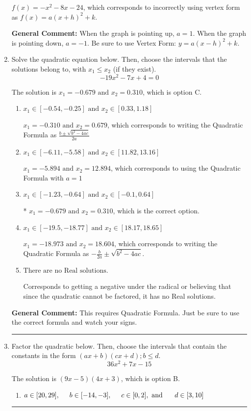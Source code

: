 \documentclass{extbook}[14pt]
\newcommand{\litem}[1]{\item #1

\rule{\textwidth}{0.4pt}}
\begin{document}
\begin{enumerate}
{\begin{enumerate}[label=\Alph*.]
$f(x)=-x^{2} -8 x -24$, which corresponds to incorrectly using vertex form as $f(x) = a(x+h)^2+k$.
\end{enumerate}

\textbf{General Comment:} When the graph is pointing up, $a=1$. When the graph is pointing down, $a=-1$. Be sure to use Vertex Form: $y = a(x-h)^2+k$.
}
\litem{
Solve the quadratic equation below. Then, choose the intervals that the solutions belong to, with $x_1 \leq x_2$ (if they exist).
\[ -19x^{2} -7 x + 4 = 0 \]

The solution is \( x_1 = -0.679 \text{ and } x_2 = 0.310 \), which is option C.\begin{enumerate}[label=\Alph*.]
\item \( x_1 \in [-0.54, -0.25] \text{ and } x_2 \in [0.33, 1.18] \)

 $x_1 = -0.310 \text{ and } x_2 = 0.679$, which corresponds to writing the Quadratic Formula as $\frac{b \pm \sqrt{b^2 - 4ac}}{2a}$
\item \( x_1 \in [-6.11, -5.58] \text{ and } x_2 \in [11.82, 13.16] \)

 $x_1 = -5.894 \text{ and } x_2 = 12.894$, which corresponds to using the Quadratic Formula with $a=1$
\item \( x_1 \in [-1.23, -0.64] \text{ and } x_2 \in [-0.1, 0.64] \)

* $x_1 = -0.679 \text{ and } x_2 = 0.310$, which is the correct option.
\item \( x_1 \in [-19.5, -18.77] \text{ and } x_2 \in [18.17, 18.65] \)

 $x_1 = -18.973 \text{ and } x_2 = 18.604$, which corresponds to writing the Quadratic Formula as $-\frac{b}{2a} \pm \sqrt{b^2 - 4ac}$.
\item \( \text{There are no Real solutions.} \)

Corresponds to getting a negative under the radical or believing that since the quadratic cannot be factored, it has no Real solutions.
\end{enumerate}

\textbf{General Comment:} This requires Quadratic Formula. Just be sure to use the correct formula and watch your signs.
}
\litem{
Factor the quadratic below. Then, choose the intervals that contain the constants in the form $(ax+b)(cx+d); b \leq d.$
\[ 36x^{2} +7 x -15 \]

The solution is \( (9x -5)(4x + 3) \), which is option B.\begin{enumerate}[label=\Alph*.]
\item \( a \in [20, 29], \hspace*{5mm} b \in [-14, -3], \hspace*{5mm} c \in [0, 2], \text{ and } \hspace*{5mm} d \in [3, 10] \)


\end{enumerate}}
\end{enumerate}
\end{document}

